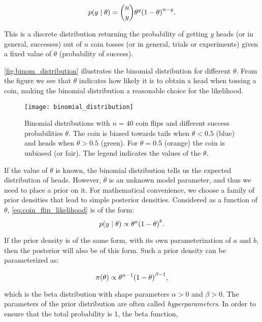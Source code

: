 \begin{equation}\label{eq:coin_flip_likelihood}
    p \qty(y \mid \theta) = \binom{n}{y} \theta^y \qty(1 - \theta)^{n-y}.
\end{equation}

This is a discrete distribution returning the probability of getting $y$ heads (or in general, successes) out of $n$ coin tosses (or in general, trials or experiments) given a fixed value of $\theta$ (probability of success). 

\autoref{fig:binom_distribution} illustrates the binomial distribution for different $\theta$. From the figure we see that $\theta$ indicates how likely it is to obtain a head when tossing a coin, making the binomial distribution a reasonable choice for the likelihood. 

\begin{figure}[ht]
    \centering
    \texttt{[image: binomial\_distribution]}
    \caption{Binomial distributions with $n=40$ coin flips and different success probabilities $\theta$. The coin is biased towards tails when $\theta < 0.5$ (blue) and heads when $\theta > 0.5$ (green). For $\theta=0.5$ (orange) the coin is unbiased (or fair). The legend indicates the values of the $\theta$.}
    \label{fig:binom_distribution}
\end{figure} 

If the value of $\theta$ is known, the binomial distribution tells us the expected distribution of heads. However, $\theta$ is an unknown model parameter, and thus we need to place a prior on it. For mathematical convenience, we choose a family of prior densities that lead to simple posterior densities. Considered as a function of $\theta$, \autoref{eq:coin_flip_likelihood} is of the form: 
\begin{equation*}
    p \qty(y \mid \theta) \propto \theta^a \qty(1 - \theta)^b.
\end{equation*} 

If the prior density is of the same form, with its own parameterization of $a$ and $b$, then the posterior will also be of this form. Such a prior density can be parameterized as: 

\begin{equation*}
    \pi \qty(\theta) \propto \theta^{\alpha - 1} \qty(1 - \theta)^{\beta -1},
\end{equation*}

which is the beta distribution with shape parameters $\alpha>0$ and $\beta>0$. The parameters of the prior distribution are often called \textit{hyperparameters}. In order to ensure that the total probability is 1, the beta function,

